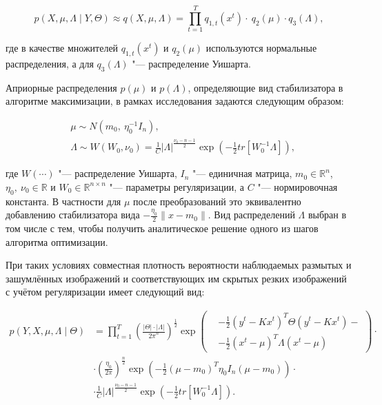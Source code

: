 \begin{equation*}
	p\left(X,\mu,\Lambda\middle|Y,\Theta\right)\approx q\left(X,\mu,\Lambda\right)=\prod_{t=1}^{T}{q_{1,t}\left(x^t\right)\cdot\ q_2\left(\mu\right)\cdot q_3\left(\Lambda\right)},
\end{equation*}

\noindent где в качестве множителей $q_{1,t}\left(x^t\right)$ и $q_2\left(\mu\right)$ используются нормальные распределения, а для $q_3\left(\Lambda\right)$ "--- распределение Уишарта.

Априорные распределения $p\left(\mu\right)$ и $p\left(\Lambda\right)$, определяющие вид стабилизатора в алгоритме максимизации, в рамках исследования задаются следующим образом:

\begin{align*}
	&\mu \sim N\left(m_0,\ \eta_0^{-1}I_n\right), \\
	&\Lambda \sim W\left(W_0,\nu_0\right)=\frac{1}{C}\left|\Lambda\right|^\frac{\nu_0-n-1}{2}\exp{\left(-\frac{1}{2}tr\left[W_0^{-1}\Lambda\right]\right)},
\end{align*}

\noindent где $W(\cdots)$ "--- распределение Уишарта, $I_n$ "--- единичная матрица, $m_0\in\mathbb{R}^n$, $\eta_0,\ \nu_0\in\mathbb{R}$ и $W_0\in\mathbb{R}^{n \times n}$ "--- параметры регуляризации, а $C$ "--- нормировочная константа. В частности для $\mu$ после преобразований это эквивалентно добавлению стабилизатора вида $-\frac{\eta_0}{2} \lVert x - m_0 \rVert$. Вид распределений $\Lambda$ выбран в том числе с тем, чтобы получить аналитическое решение одного из шагов алгоритма оптимизации.

При таких условиях совместная плотность вероятности наблюдаемых размытых и зашумлённых изображений и соответствующих им скрытых резких изображений с учётом регуляризации имеет следующий вид:

\begin{align*}
	p\left(Y,X,\mu,\Lambda \middle| \Theta\right) &= \prod_{t=1}^{T} \left( \frac{\lvert\Theta\rvert \cdot \lvert\Lambda\rvert}{{2\pi}^{n}} \right)^\frac{1}{2} \exp\left(
	\begin{aligned}
		&-\frac{1}{2}\left(y^t-Kx^t\right)^T\Theta\left(y^t-Kx^t\right) - \\
		&-\frac{1}{2}\left(x^t-\mu\right)^T\Lambda\left(x^t-\mu\right)
	\end{aligned}
	\right) \cdot \\
	&\cdot \left(\frac{\eta_0}{2\pi}\right)^\frac{n}{2} \exp \left(-\frac{1}{2}\left(\mu-m_0\right)^T\eta_0I_n\left(\mu-m_0\right)\right) \cdot \\
	&\cdot \frac{1}{C}\lvert\Lambda\rvert^\frac{\nu_0-n-1}{2}\exp{\left(-\frac{1}{2}tr\left[W_0^{-1}\Lambda\right]\right)}.
\end{align*}

